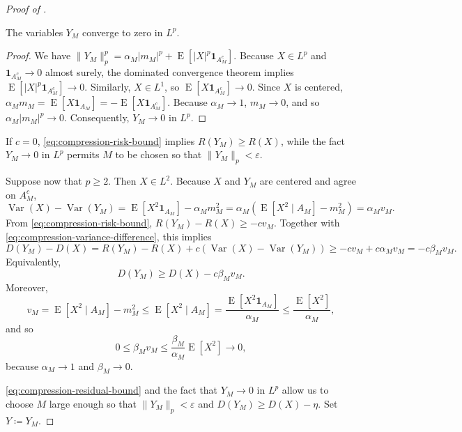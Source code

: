 \documentclass[10pt,a4paper]{amsart}
\begin{document}
\begin{proof}[Proof of ]
\begin{claim}
    The variables \(Y_M\) converge to zero in \(L^p\).
\end{claim}
\begin{proof}
We have \(\lVert Y_M\rVert_p^p
=
\alpha_M|m_M|^p
+
\operatorname{E}\left[|X|^p\mathbf 1_{A_M^c}\right]\). Because \(X\in L^p\) and \(\mathbf 1_{A_M^c}\to0\) almost surely, the dominated convergence theorem implies
\(\operatorname{E}\left[|X|^p\mathbf 1_{A_M^c}\right] \rightarrow 0\).
Similarly, \(X\in L^1\), so
\(\operatorname{E}\left[X\mathbf 1_{A_M^c}\right]\rightarrow0\). Since \(X\) is centered,
\(\alpha_Mm_M
=
\operatorname{E}\left[X\mathbf 1_{A_M}\right]
=
-\operatorname{E}\left[X\mathbf 1_{A_M^c}\right]\). Because \(\alpha_M\to1\), \(m_M\to0\), and so
\(\alpha_M|m_M|^p\to0\). Consequently,
\(Y_M \rightarrow 0\) in \(L^p\).
\end{proof}


If \(c=0\), \eqref{eq:compression-risk-bound} implies \(R(Y_M)\geq R(X)\), while the fact \(Y_M \rightarrow 0\) in \(L^p\) permits \(M\) to be chosen so that \(\lVert Y_M\rVert_p<\varepsilon\).


Suppose now that \(p\geq2\). Then \(X\in L^2\). Because \(X\) and \(Y_M\) are centered and agree on \(A_M^c\),
\[\operatorname{Var}(X)-\operatorname{Var}(Y_M) =
\operatorname{E}[X^2\mathbf 1_{A_M}]
-\alpha_Mm_M^2 = \alpha_M\left(
\operatorname{E}[X^2\mid A_M]-m_M^2
\right) = \alpha_Mv_M.
\tag{3}\label{eq:compression-variance-difference}
\]
From \eqref{eq:compression-risk-bound}, \(R(Y_M)-R(X)\geq-cv_M\). Together with
\eqref{eq:compression-variance-difference}, this implies
\[D(Y_M)-D(X) =
R(Y_M)-R(X)
+c\left(\operatorname{Var}(X)-\operatorname{Var}(Y_M)\right) \geq -cv_M+c\alpha_Mv_M = -c\beta_Mv_M.
\]
Equivalently,
\[
D(Y_M)\geq D(X)-c\beta_Mv_M.
\tag{4}\label{eq:compression-residual-bound}
\]
Moreover,
\[
v_M
=
\operatorname{E}[X^2\mid A_M]-m_M^2
\leq
\operatorname{E}[X^2\mid A_M]
=
\frac{\operatorname{E}[X^2\mathbf 1_{A_M}]}{\alpha_M}
\leq
\frac{\operatorname{E}[X^2]}{\alpha_M},
\]
and so
\[
0\leq\beta_Mv_M
\leq
\frac{\beta_M}{\alpha_M}\operatorname{E}[X^2]
\longrightarrow0,
\]
because \(\alpha_M\to1\) and \(\beta_M\to0\).

\eqref{eq:compression-residual-bound} and the fact that \(Y_M \rightarrow 0\) in \(L^p\) allow us to choose \(M\) large enough so that \(\lVert Y_M\rVert_p<\varepsilon\) and \(D(Y_M)\geq D(X)-\eta\). Set \(Y\coloneqq Y_M\).
\end{proof}
\end{document}
